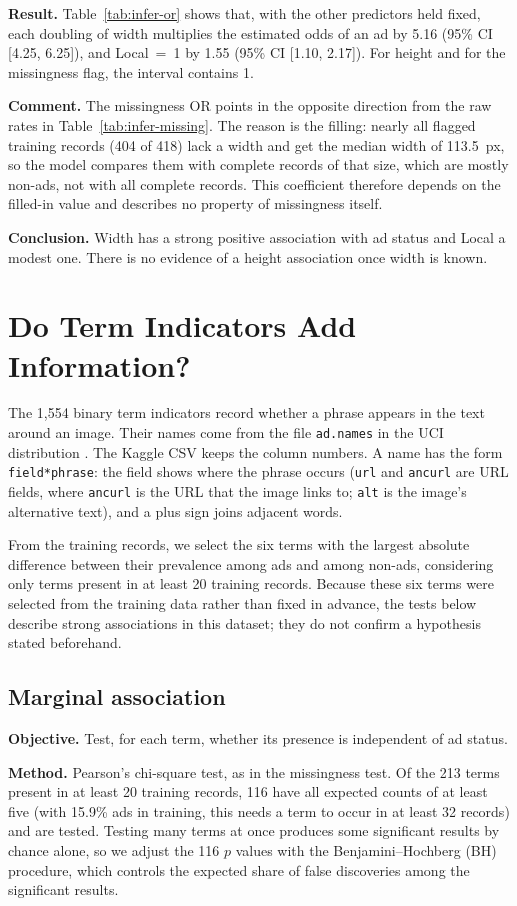 \textbf{Result.} Table~\ref{tab:infer-or} shows that, with the other
predictors held fixed, each doubling of width multiplies the estimated odds
of an ad by 5.16 (95\% CI [4.25, 6.25]), and Local~=~1 by 1.55 (95\% CI
[1.10, 2.17]). For height and for the missingness flag, the interval contains 1.

\textbf{Comment.} The missingness OR points in the opposite direction from
the raw rates in Table~\ref{tab:infer-missing}. The reason is the filling:
nearly all flagged training records (404 of 418) lack a width and get the
median width of 113.5~px, so the
model compares them with complete records of that size, which are mostly
non-ads, not with all complete records. This coefficient therefore depends
on the filled-in value and describes no property of missingness itself.

\textbf{Conclusion.} Width has a strong positive association with ad status
and Local a modest one. There is no evidence of a height association once
width is known.

\section{Do Term Indicators Add Information?}
The 1,554 binary term indicators record whether a phrase appears in the
text around an image. Their names come from the file \texttt{ad.names} in
the UCI distribution \citep{kushmerick1999}. The Kaggle CSV keeps the column numbers. A name has the form
\texttt{field*phrase}: the field shows where the phrase occurs
(\texttt{url} and \texttt{ancurl} are URL fields, where \texttt{ancurl} is
the URL that the image links to; \texttt{alt} is the image's alternative
text), and a plus sign joins adjacent words.

From the training records, we select the six terms with the largest
absolute difference between their prevalence among ads and among non-ads,
considering only terms present in at least 20 training records. Because
these six terms were selected from the training data rather than fixed in
advance, the tests below describe strong associations in this dataset; they
do not confirm a hypothesis stated beforehand.

\subsection{Marginal association}
\textbf{Objective.} Test, for each term, whether its presence is
independent of ad status.

\textbf{Method.} Pearson's chi-square test, as in the missingness test. Of
the 213 terms present in at least 20 training records, 116 have all
expected counts of at least five (with 15.9\% ads in training, this needs a
term to occur in at least 32 records) and are tested. Testing many terms at once
produces some significant results by chance alone, so we adjust the 116
$p$ values with the Benjamini--Hochberg (BH) procedure, which controls the
expected share of false discoveries among the significant results.

